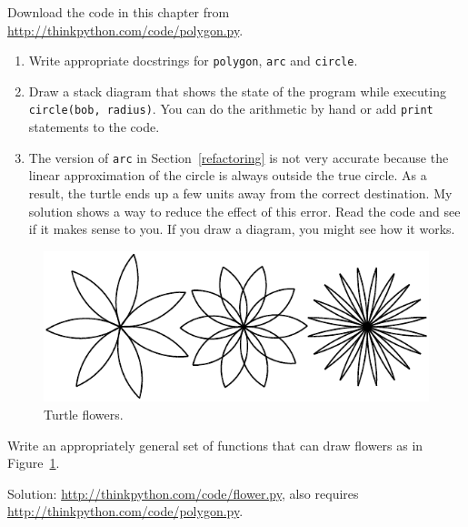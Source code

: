 \documentclass[10pt]{book}
\begin{document}
\begin{CJK}{UTF8}{gbsn}
\begin{exercise}
Download the code in this chapter from
\url{http://thinkpython.com/code/polygon.py}.

\begin{enumerate}

\item Write appropriate docstrings for {\tt polygon}, {\tt arc} and
{\tt circle}.

\item Draw a stack diagram that shows the state of the program
while executing {\tt circle(bob, radius)}.  You can do the
arithmetic by hand or add {\tt print} statements to the code.

\item The version of {\tt arc} in Section~\ref{refactoring} is not
very accurate because the linear approximation of the
circle is always outside the true circle.  As a result,
the turtle ends up a few units away from the correct
destination. My solution shows a way to reduce
the effect of this error.  Read the code and see if it makes
sense to you.  If you draw a diagram, you might see how it works.

\end{enumerate}

\end{exercise}

\begin{figure}
\centerline
{\includegraphics[scale=0.8]{figs/flowers.pdf}}
\caption{Turtle flowers.}
\label{fig.flowers}
\end{figure}

\begin{exercise}

Write an appropriately general set of functions that
can draw flowers as in Figure~\ref{fig.flowers}.

Solution: \url{http://thinkpython.com/code/flower.py},
also requires \url{http://thinkpython.com/code/polygon.py}.

\end{exercise}


\end{CJK}
\end{document}
